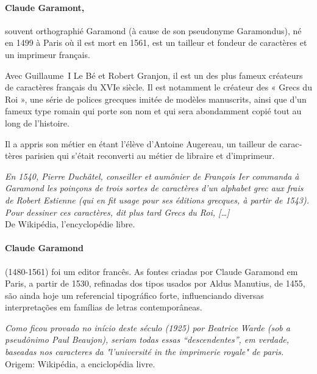 \documentclass[pagesize,DIV14]{scrartcl}
\begin{document}
\begin{multicols}{2}
\begin{french}
\paragraph*{Claude Garamont,} souvent orthographié Garamond (à cause de son pseudonyme Garamondus), né en 1499 à Paris où il est mort en 1561, est un tailleur et fondeur de caractères et un imprimeur français.

Avec Guillaume~I Le Bé et Robert Granjon, il est un des plus fameux créateurs de caractères français du {XVI{e}} siècle. Il est notamment le créateur des « Grecs du Roi », une série de polices grecques imitée de modèles manuscrits, ainsi que d’un fameux type romain qui porte son nom et qui sera abondamment copié tout au long de l’histoire.

Il a appris son métier en étant l’élève d’Antoine Augereau, un tailleur de caractères parisien qui s’était reconverti au métier de libraire et d’imprimeur.

\textit{En 1540, Pierre Duchâtel, conseiller et aumônier de François I{er} commanda à Garamond les poinçons de trois sortes de caractères d’un alphabet grec aux frais de Robert Estienne (qui en fit usage pour ses éditions grecques, à partir de 1543). Pour dessiner ces caractères, dit plus tard Grecs du Roi, […]}\\
{\scriptsize De Wikipédia, l'encyclopédie libre.}
\end{french}

\begin{portuges}
\paragraph*{Claude Garamond} (1480-1561) foi um editor francês. As fontes criadas por Claude Garamond em Paris, a partir de 1530, refinadas dos tipos usados por Aldus Manutius, de 1455, são ainda hoje um referencial tipográfico forte, influenciando diversas interpretações em famílias de letras contemporâneas.

\textit{Como ficou provado no início deste século (1925) por Beatrice Warde (sob a pseudônimo Paul Beaujon), seriam todas essas “descendentes”, em verdade, baseadas nos caracteres da "l’université in the imprimerie royale" de paris.}\\
{\scriptsize Origem: Wikipédia, a enciclopédia livre.}
\end{portuges}
\begin{italian}

\end{italian}
\end{multicols}
\end{document}
